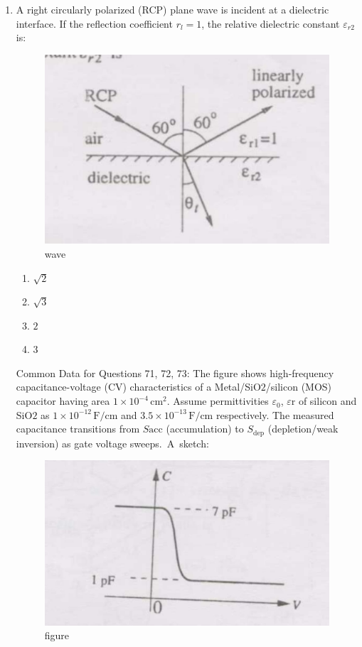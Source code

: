 \documentclass[journal,12pt,onecolumn]{IEEEtran}
\theoremstyle{remark}
\begin{document}
\begin{enumerate}
\item A right circularly polarized (RCP) plane wave is incident at a dielectric interface. If the reflection coefficient $r_{l}=1$, the relative dielectric constant $\varepsilon_{r2}$ is:

\begin{figure}[H]
    \centering
    \includegraphics[width=0.4\linewidth]{Q70.jpg}
    \caption{wave}
    \label{fig:full_wave}
\end{figure}
\hfill{}

\begin{multicols}{4}
\begin{enumerate}
  \item $\sqrt{2}$
  \item $\sqrt{3}$
  \item $2$
  \item $3$
\end{enumerate}
\end{multicols}

{Common Data for Questions 71, 72, 73:} 
The figure shows high-frequency capacitance-voltage (CV) characteristics of a Metal/SiO$2$/silicon (MOS) capacitor having area $1\times10^{-4}\,\text{cm}^2$. Assume permittivities $\varepsilon_0$, $\varepsilon{\text{r}}$ of silicon and SiO$2$ as $1\times 10^{-12}\,\text{F/cm}$ and $3.5\times10^{-13}\,\text{F/cm}$ respectively. The measured capacitance transitions from $S\text{acc}$ (accumulation) to $S_\text{dep}$ (depletion/weak inversion) as gate voltage sweeps. A sketch:

\begin{figure}[H]
    \centering
    \includegraphics[width=0.5\linewidth]{Q71Q72Q73.jpg}
    \caption{figure}
    \label{fig:full_wave}
\end{figure}


\end{enumerate}
\end{document}
